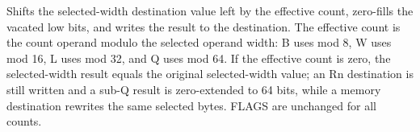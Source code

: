 Shifts the selected-width destination value left by the effective count, zero-fills the vacated low bits, and writes the result to the destination. The effective count is the count operand modulo the selected operand width: B uses mod 8, W uses mod 16, L uses mod 32, and Q uses mod 64. If the effective count is zero, the selected-width result equals the original selected-width value; an Rn destination is still written and a sub-Q result is zero-extended to 64 bits, while a memory destination rewrites the same selected bytes. FLAGS are unchanged for all counts.
